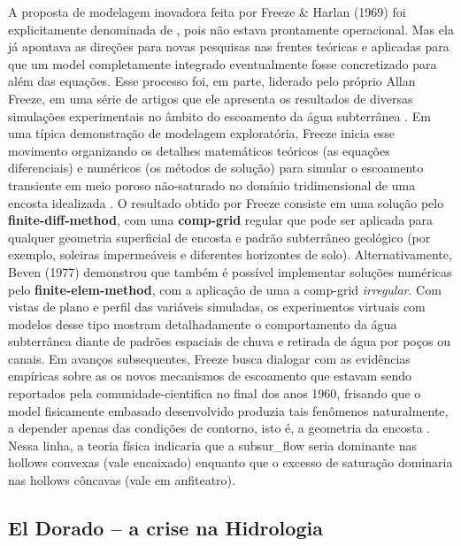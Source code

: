 \documentclass[./main.tex]{subfiles}
\begin{document}
\par A proposta de modelagem inovadora feita por Freeze \& Harlan (1969) foi explicitamente denominada de , pois não estava prontamente operacional. Mas ela já apontava as direções para novas pesquisas nas frentes teóricas e aplicadas para que um \gls{model} completamente integrado eventualmente fosse concretizado para além das equações. Esse processo foi, em parte, liderado pelo próprio Allan Freeze, em uma série de artigos que ele apresenta os resultados de diversas simulações experimentais no âmbito do escoamento da água subterrânea \cite{Freeze1974a}. Em uma típica demonstração de modelagem exploratória, Freeze inicia esse movimento organizando os detalhes matemáticos teóricos (as equações diferenciais) e numéricos (os métodos de solução) para simular o escoamento transiente em meio poroso não-saturado no domínio tridimensional de uma encosta idealizada \cite{Freeze1971a}. O resultado obtido por Freeze consiste em uma solução pelo \textbf{\gls{finite-diff-method}}, com uma \textbf{\gls{comp-grid}} regular que pode ser aplicada para qualquer geometria superficial de encosta e padrão subterrâneo geológico (por exemplo, soleiras impermeáveis e diferentes horizontes de solo). Alternativamente, Beven (1977) \cite{Beven1977a} demonstrou que também é possível implementar soluções numéricas pelo \textbf{\gls{finite-elem-method}}, com a aplicação de uma a \gls{comp-grid} \textit{irregular}. Com vistas de plano e perfil das variáveis simuladas, os experimentos virtuais com modelos desse tipo mostram detalhadamente o comportamento da água subterrânea diante de padrões espaciais de chuva e retirada de água por poços ou canais. Em avanços subsequentes, Freeze busca dialogar com as evidências empíricas sobre as os novos mecanismos de escoamento que estavam sendo reportados pela \gls{comunidade-cientifica} no final dos anos 1960, frisando que o \gls{model} fisicamente embasado desenvolvido produzia tais fenômenos naturalmente, a depender apenas das condições de contorno, isto é, a geometria da encosta \cite{Freeze1972a, Freeze1972b}. Nessa linha, a \gls{teoria} física indicaria que a \gls{subsur_flow} seria dominante nas \gls{hollows} convexas (vale encaixado) enquanto que o excesso de saturação dominaria nas \gls{hollows} côncavas (vale em anfiteatro). 

\subsection{El Dorado -- a crise na Hidrologia} \label{sec:hydro:broken}
\end{document}
